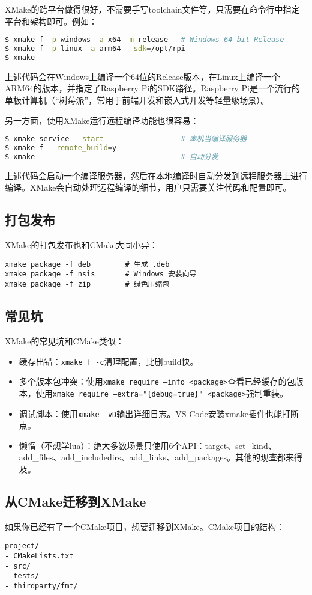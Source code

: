 \documentclass[../main.tex]{subfiles}
\begin{document}
XMake的跨平台做得很好，不需要手写toolchain文件等，只需要在命令行中指定平台和架构即可。例如：
\begin{lstlisting}[language=bash]
$ xmake f -p windows -a x64 -m release   # Windows 64-bit Release
$ xmake f -p linux -a arm64 --sdk=/opt/rpi
$ xmake
\end{lstlisting}
上述代码会在Windows上编译一个64位的Release版本，在Linux上编译一个ARM64的版本，并指定了Raspberry Pi的SDK路径。Raspberry Pi是一个流行的单板计算机（“树莓派”，常用于前端开发和嵌入式开发等轻量级场景）。

另一方面，使用XMake运行远程编译功能也很容易：
\begin{lstlisting}[language=bash]
$ xmake service --start                  # 本机当编译服务器
$ xmake f --remote_build=y
$ xmake                                  # 自动分发
\end{lstlisting}
上述代码会启动一个编译服务器，然后在本地编译时自动分发到远程服务器上进行编译。XMake会自动处理远程编译的细节，用户只需要关注代码和配置即可。

\subsection{打包发布}
XMake的打包发布也和CMake大同小异：
\begin{lstlisting}
xmake package -f deb        # 生成 .deb
xmake package -f nsis       # Windows 安装向导
xmake package -f zip        # 绿色压缩包
\end{lstlisting}

\subsection{常见坑}
XMake的常见坑和CMake类似：
\begin{itemize}
    \item 缓存出错：\texttt{xmake f -c}清理配置，比删build快。
    \item 多个版本包冲突：使用\texttt{xmake require --info <package>}查看已经缓存的包版本，使用\texttt{xmake require --extra="\{debug=true\}" <package>}强制重装。
    \item 调试脚本：使用\texttt{xmake -vD}输出详细日志。VS Code安装xmake插件也能打断点。
    \item 懒惰（不想学lua）：绝大多数场景只使用6个API：target、set\_kind、add\_files、add\_includedirs、add\_links、add\_packages。其他的现查都来得及。
\end{itemize}

\subsection{从CMake迁移到XMake}
如果你已经有了一个CMake项目，想要迁移到XMake。CMake项目的结构：
\begin{lstlisting}
project/
- CMakeLists.txt
- src/
- tests/
- thirdparty/fmt/
\end{lstlisting}
\end{document}
